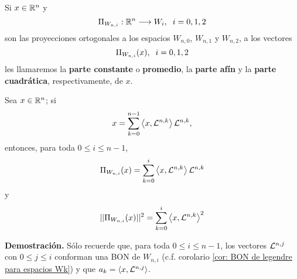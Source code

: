 \begin{defi}
Si $x \in \mathbb{R}^{n}$ y
\begin{equation}
\label{eq0: 5Dic}
\Pi_{W_{n,i}}: \mathbb{R} ^{n}  \longrightarrow W_{i}, \hspace{0.2cm}
i=0,1,2
\end{equation}
son las proyecciones ortogonales
a los espacios 
$W_{n,0}$, $W_{n,1}$ y $W_{n,2}$, a los vectores
\[
\Pi_{W_{n,i}}(x), \hspace{0.2cm} i=0,1,2
\]
les llamaremos la \textbf{parte constante}
o \textbf{promedio}, la \textbf{parte afín} y la
\textbf{parte cuadrática}, respectivamente, de $x$.
\end{defi}

\begin{prop}
\label{prop: proyecciones a espacios Wn,k}
Sea $x \in \mathbb{R}^{n}$; si
\[
x= \sum\limits_{k=0}^{n-1}\left\langle x, \mathcal{L}^{n,k} \right\rangle\mathcal{L}^{n,k},
\]
entonces, para toda $0 \leq i \leq n-1$,
\[
\Pi_{W_{n,i}}(x)=\sum\limits_{k=0}^{i}\left\langle x, \mathcal{L}^{n,k} \right\rangle\mathcal{L}^{n,k}
\]
y
\[
||\Pi_{W_{n,i}}(x)||^{2}=\sum\limits_{k=0}^{i}\left\langle x, \mathcal{L}^{n,k} \right\rangle^{2}
\]
\end{prop}
\textbf{Demostración.}
Sólo recuerde que, para toda $0 \leq i \leq n-1$,
los vectores $\mathcal{L}^{n, j}$ con $0 \leq j \leq i$
conforman una BON de $W_{n,i}$
(c.f. corolario \ref{cor: BON de legendre para espacios Wk}) y
que $a_{k}= \langle x, \mathcal{L}^{n,j} \rangle$.
\QEDB 
\vspace{0.2cm}

